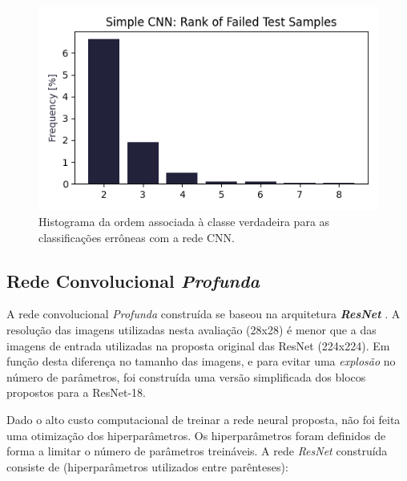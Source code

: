 \documentclass[final,5p]{elsarticle}
\numberwithin{equation}{section}
\begin{document}
    \begin{figure}[hbt!]
        \includegraphics[width=0.95\columnwidth]{CNN_Simple_rank.png}
        \caption{Histograma da ordem associada à classe verdadeira para as classificações errôneas com a rede CNN.}\label{fig:HistogramaErrosCNN}
    \end{figure}

    \subsection{Rede Convolucional \emph{Profunda}}

    A rede convolucional \emph{Profunda} construída se baseou na arquitetura \textbf{\emph{ResNet}} \cite{he2015deep}. A resolução das imagens utilizadas nesta avaliação (28x28) é menor que a das imagens de entrada utilizadas na proposta original das ResNet (224x224). Em função desta diferença no tamanho das imagens, e para evitar uma \emph{explosão} no número de parâmetros, foi construída uma versão simplificada dos blocos propostos para a ResNet-18.

    Dado o alto custo computacional de treinar a rede neural proposta, não foi feita uma otimização dos hiperparâmetros. Os hiperparâmetros foram definidos de forma a limitar o número de parâmetros treináveis. A rede \emph{ResNet} construída consiste de (hiperparâmetros utilizados entre parênteses):
\end{document}
